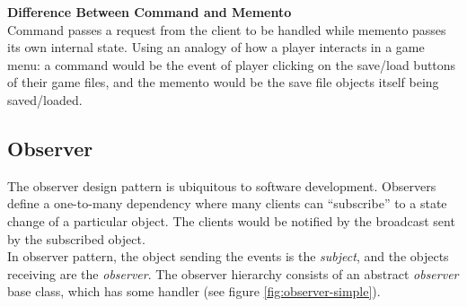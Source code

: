 \begin{multicols}{2}
\textbf{Difference Between Command and Memento}\bs
\\

Command passes a request from the client to be handled while memento passes its own internal state. Using an analogy of how a player interacts in a game menu: a command would be the event of player clicking on the save/load buttons of their game files, and the memento would be the save file objects itself being saved/loaded.\bs
\\

\subsection{Observer}

The observer design pattern is ubiquitous to software development. Observers define a one-to-many dependency where many clients can ``subscribe'' to a state change of a particular object. The clients would be notified by the broadcast sent by the subscribed object.\bs
\\
In observer pattern, the object sending the events is the \textit{subject}, and the objects receiving are the \textit{observer}. The observer hierarchy consists of an abstract \textit{observer} base class, which has some handler (see figure \ref{fig:observer-simple}).

\begin{figure}[H]
	\centering



\end{figure}
\end{multicols}
